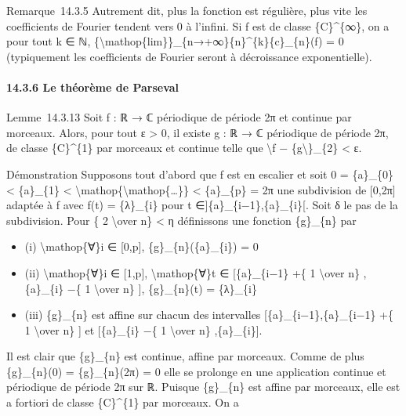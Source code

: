 \documentclass[]{article}
\begin{document}
Remarque~14.3.5 Autrement dit, plus la fonction est régulière, plus vite
les coefficients de Fourier tendent vers 0 à l'infini. Si f est de
classe \{C\}\^{}\{∞\}, on a pour tout k ∈ ℕ,
\{\textbackslash{}mathop\{lim\}\}\_\{\textbar{}n\textbar{}→+∞\}\{n\}\^{}\{k\}\{c\}\_\{n\}(f)
= 0 (typiquement les coefficients de Fourier seront à décroissance
exponentielle).

\paragraph{14.3.6 Le théorème de Parseval}

Lemme~14.3.13 Soit f : ℝ → ℂ périodique de période 2π et continue par
morceaux. Alors, pour tout ε \textgreater{} 0, il existe g : ℝ → ℂ
périodique de période 2π, de classe \{C\}\^{}\{1\} par morceaux et
continue telle que \textbackslash{}\textbar{}f −
\{g\textbackslash{}\textbar{}\}\_\{2\} \textless{} ε.

Démonstration Supposons tout d'abord que f est en escalier et soit 0 =
\{a\}\_\{0\} \textless{} \{a\}\_\{1\} \textless{}
\textbackslash{}mathop\{\textbackslash{}mathop\{\ldots{}\}\} \textless{}
\{a\}\_\{p\} = 2π une subdivision de {[}0,2π{]} adaptée à f avec f(t) =
\{λ\}\_\{i\} pour t ∈{]}\{a\}\_\{i−1\},\{a\}\_\{i\}{[}. Soit δ le pas de
la subdivision. Pour \{ 2 \textbackslash{}over n\} \textless{} η
définissons une fonction \{g\}\_\{n\} par

\begin{itemize}
\itemsep1pt\parskip0pt
\item
  (i) \textbackslash{}mathop\{∀\}i ∈ {[}0,p{]},
  \{g\}\_\{n\}(\{a\}\_\{i\}) = 0
\item
  (ii) \textbackslash{}mathop\{∀\}i ∈ {[}1,p{]},
  \textbackslash{}mathop\{∀\}t ∈ {[}\{a\}\_\{i−1\} +\{ 1
  \textbackslash{}over n\} ,\{a\}\_\{i\} −\{ 1 \textbackslash{}over n\}
  {]}, \{g\}\_\{n\}(t) = \{λ\}\_\{i\}
\item
  (iii) \{g\}\_\{n\} est affine sur chacun des intervalles
  {[}\{a\}\_\{i−1\},\{a\}\_\{i−1\} +\{ 1 \textbackslash{}over n\} {]} et
  {[}\{a\}\_\{i\} −\{ 1 \textbackslash{}over n\} ,\{a\}\_\{i\}{]}.
\end{itemize}

Il est clair que \{g\}\_\{n\} est continue, affine par morceaux. Comme
de plus \{g\}\_\{n\}(0) = \{g\}\_\{n\}(2π) = 0 elle se prolonge en une
application continue et périodique de période 2π sur ℝ. Puisque
\{g\}\_\{n\} est affine par morceaux, elle est a fortiori de classe
\{C\}\^{}\{1\} par morceaux. On a
\end{document}
